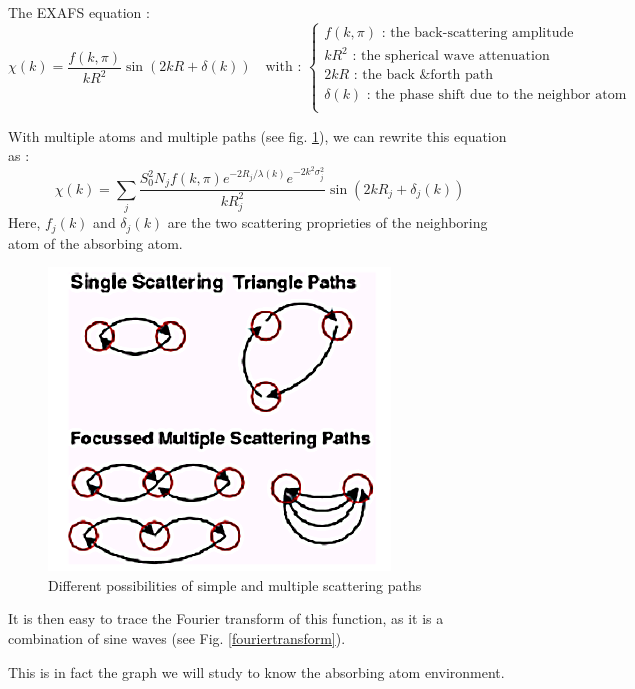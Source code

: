 \documentclass[11pt,a4paper,oneside]{report}
\begin{document}
The EXAFS equation :
\[  \chi(k) = \frac{f(k,\pi)}{kR^2}\sin(2kR+\delta(k))
\quad\text{with : } \left\{
\begin{array}{ll}
f(k,\pi)\text{ : the back-scattering amplitude}\\
kR^2\text{ : the spherical wave attenuation}\\
2kR\text{ : the back \& forth path}\\
\delta(k)\text{ : the phase shift due to the neighbor atom}\\
\end{array}
\right.
\]


With multiple atoms and multiple paths (see fig. \ref{exafsmultiplepaths}), we can rewrite this equation as :
\[  \chi(k) = \sum_j\frac{S_0^2 N_j f(k,\pi) e^{-2R_j/\lambda(k)}e^{-2k^2\sigma_j^2}}{kR_j^2}\sin(2kR_j+\delta_j(k))
\]
Here, $f_j(k)$ and $\delta_j(k)$ are the two scattering proprieties of the neighboring atom of the absorbing atom.

\begin{figure}[H]
    \begin{center}
        \includegraphics[height=0.35\textwidth]{Images/multiplePaths}
        \caption{Different possibilities of simple and multiple scattering paths}
        \label{exafsmultiplepaths}
    \end{center}
\end{figure}

It is then easy to trace the Fourier transform of this function, as it is a combination of sine waves (see Fig. \ref{fouriertransform}).

This is in fact the graph we will study to know the absorbing atom environment.
\end{document}
